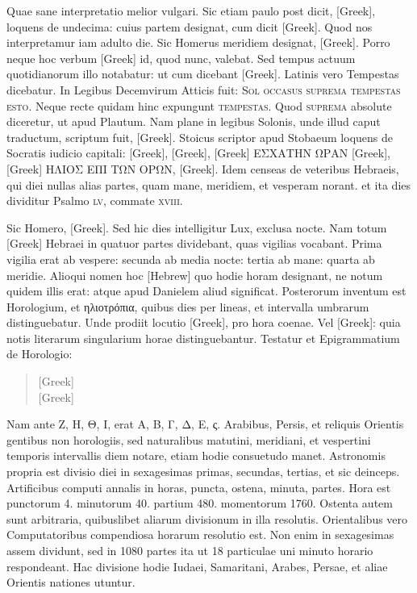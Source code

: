 Quae sane interpretatio melior vulgari.
Sic etiam paulo post dicit,
\textgreek{[Greek]}, loquens de undecima: cuius partem designat,
 cum dicit
\textgreek{[Greek]}.
Quod nos interpretamur iam adulto die.
Sic Homerus
meridiem designat, \textgreek{[Greek]}.
Porro neque
hoc verbum \textgreek{[Greek]} id, quod nunc, valebat.
Sed tempus actuum quotidianorum
illo notabatur: ut cum dicebant \textgreek{[Greek]}.
Latinis
vero Tempestas dicebatur.
In Legibus Decemvirum Atticis fuit:
\textsc{Sol occasus suprema tempestas esto}.
Neque recte
quidam hinc expungunt \textsc{tempestas}.
Quod \textsc{suprema} absolute
diceretur, ut apud Plautum.
Nam plane in legibus Solonis, unde illud
caput traductum, scriptum fuit,
 \textgreek{[Greek]}.
Stoicus
scriptor apud Stobaeum loquens de Socratis iudicio capitali: 
\textgreek{[Greek], [Greek], [Greek]
ΕΣΧΑΤΗΝ ΩΡΑΝ [Greek], [Greek] ΗΛΙΟΣ ΕΠΙ ΤΩΝ
ΟΡΩΝ, [Greek]}.
Idem censeas de veteribus Hebraeis,
qui diei nullas alias partes, quam mane, meridiem, et vesperam norant.
et ita dies dividitur Psalmo \textsc{lv}, commate \textsc{xviii}.

Sic Homero,
\textgreek{[Greek]}.
Sed hic dies intelligitur Lux, exclusa nocte.
Nam totum \textgreek{[Greek]} Hebraei in quatuor partes
 dividebant, quas vigilias
vocabant.
Prima vigilia erat ab vespere: secunda ab media nocte:
tertia ab mane: quarta ab meridie.
Alioqui nomen hoc \texthebrew{[Hebrew]} quo hodie
horam designant, ne notum quidem illis erat: atque apud Danielem
aliud significat.
Posterorum inventum est Horologium, et \textgreek{ηλιοτρόπια},
quibus dies per lineas, et intervalla umbrarum distinguebatur.
Unde prodiit locutio \textgreek{[Greek]}, pro hora coenae.
Vel \textgreek{[Greek]}:
quia notis literarum singularium horae distinguebantur.
Testatur et Epigrammatium de Horologio:
\begin{quote}
\textgreek{[Greek]}\\
\textgreek{[Greek]}
\end{quote}
Nam ante
\textgreek{Ζ, Η, Θ, Ι,} erat \textgreek{Α, Β, Γ, Δ, Ε, ς.}
Arabibus, Persis, et reliquis Orientis
gentibus non horologiis, sed
naturalibus matutini, meridiani,
et vespertini temporis
intervallis diem notare,
etiam hodie consuetudo manet.
Astronomis propria
est divisio diei in sexagesimas
primas, secundas, tertias,
et sic deinceps.
Artificibus
computi annalis in
horas, puncta, ostena, minuta,
partes.
Hora est punctorum
4. minutorum 40.
partium 480. momentorum
1760.
Ostenta autem sunt arbitraria,
quibuslibet aliarum
divisionum in illa resolutis.
Orientalibus vero Computatoribus
compendiosa horarum
resolutio est.
Non
enim in sexagesimas assem
dividunt, sed in 1080 partes
ita ut 18 particulae uni minuto
horario respondeant.
Hac divisione hodie Iudaei,
Samaritani, Arabes, Persae,
et aliae Orientis nationes utuntur.

